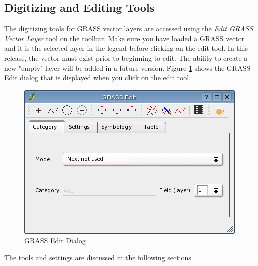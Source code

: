 \subsection{Digitizing and Editing Tools}
The digitizing tools for GRASS vector layers are accessed using the \textsl{Edit GRASS Vector Layer} tool on the toolbar. Make sure you have loaded a GRASS vector and it is the selected layer in the legend before clicking on the edit tool. In this release, the vector must exist prior to beginning to edit. The ability to create a new "empty" layer will be added in a future version. Figure \ref{fig:grass_edit} shows the GRASS Edit dialog that is displayed when you click on the edit tool. 
\begin{figure}[h]
   \begin{center}
   \caption{GRASS Edit Dialog}\label{fig:grass_edit}\smallskip
   \includegraphics[scale=.7]{qgis_user_guide_images/grassedit}
\end{center}  
\end{figure}
The tools and settings are discussed in the following sections.
